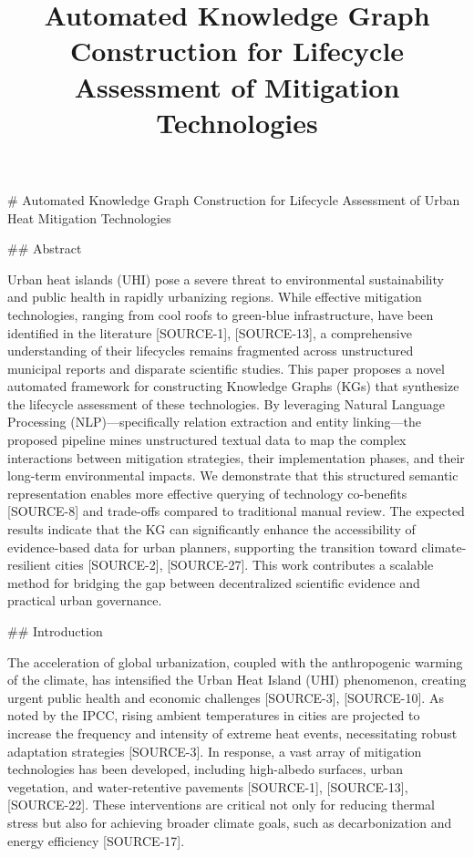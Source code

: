 \documentclass{article}
\title{Automated Knowledge Graph Construction for Lifecycle Assessment of Mitigation Technologies}
\date{}
\begin{document}
\maketitle
\# Automated Knowledge Graph Construction for Lifecycle Assessment of Urban Heat Mitigation Technologies

\#\# Abstract

Urban heat islands (UHI) pose a severe threat to environmental sustainability and public health in rapidly urbanizing regions. While effective mitigation technologies, ranging from cool roofs to green-blue infrastructure, have been identified in the literature [SOURCE-1], [SOURCE-13], a comprehensive understanding of their lifecycles remains fragmented across unstructured municipal reports and disparate scientific studies. This paper proposes a novel automated framework for constructing Knowledge Graphs (KGs) that synthesize the lifecycle assessment of these technologies. By leveraging Natural Language Processing (NLP)—specifically relation extraction and entity linking—the proposed pipeline mines unstructured textual data to map the complex interactions between mitigation strategies, their implementation phases, and their long-term environmental impacts. We demonstrate that this structured semantic representation enables more effective querying of technology co-benefits [SOURCE-8] and trade-offs compared to traditional manual review. The expected results indicate that the KG can significantly enhance the accessibility of evidence-based data for urban planners, supporting the transition toward climate-resilient cities [SOURCE-2], [SOURCE-27]. This work contributes a scalable method for bridging the gap between decentralized scientific evidence and practical urban governance.

\#\# Introduction

The acceleration of global urbanization, coupled with the anthropogenic warming of the climate, has intensified the Urban Heat Island (UHI) phenomenon, creating urgent public health and economic challenges [SOURCE-3], [SOURCE-10]. As noted by the IPCC, rising ambient temperatures in cities are projected to increase the frequency and intensity of extreme heat events, necessitating robust adaptation strategies [SOURCE-3]. In response, a vast array of mitigation technologies has been developed, including high-albedo surfaces, urban vegetation, and water-retentive pavements [SOURCE-1], [SOURCE-13], [SOURCE-22]. These interventions are critical not only for reducing thermal stress but also for achieving broader climate goals, such as decarbonization and energy efficiency [SOURCE-17].
\end{document}
